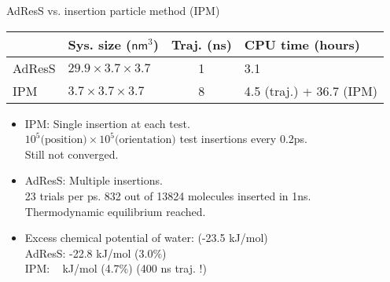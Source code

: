 \documentclass{beamer}
\newcommand{\redc}[1]{{\color{red} #1}}
\begin{document}
\begin{frame}{AdResS vs. insertion particle method (IPM)}
  \vfill
    \centering
    \begin{tabular}{l|l|c|l}
      & Sys. size ($\textsf{nm}^3$)
      & Traj. (\textsf{ns})
      & CPU time (hours)\\    \hline
      AdResS   &$29.9\times3.7\times3.7$ & 1 & 3.1\\
      IPM & $3.7\times3.7\times3.7$ & 8 & 4.5 (traj.) + 36.7 (IPM)\\
    \end{tabular}
  
  \vfill
  \begin{itemize}
  \item<1-> IPM: \redc{Single insertion} at each test.\\
    $10^5 \textrm{(position)} \times 10^5 \textrm{(orientation)}$ test insertions every 0.2ps.\\
    Still not converged.
    \vfill
  \item<1-> AdResS: \redc{Multiple insertions}.\\
    23 trials per ps. 832 out of 13824 molecules inserted in 1ns.\\
    Thermodynamic equilibrium reached.
    \vfill
  \item<2-> Excess chemical potential of water: (-23.5 kJ/mol)\\
    AdResS: -22.8 kJ/mol (3.0\%)\\
    IPM: \  kJ/mol (4.7\%) (400 ns traj. !)
  \end{itemize}
\end{frame}
\end{document}
